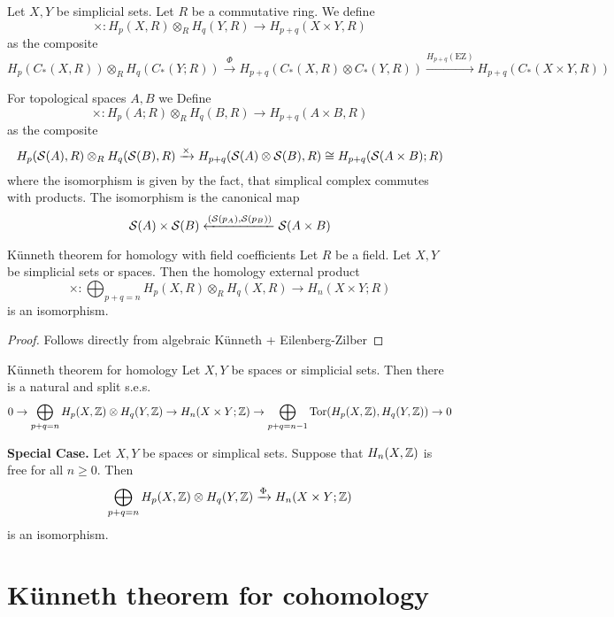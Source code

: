 \documentclass[language=english]{TemplateLecture}
\begin{document}
\begin{construction}
    Let \(X,Y\) be simplicial sets. Let \(R\) be a commutative ring. We define
    \[\times \colon H_p(X,R) \otimes_R H_q(Y,R) \to H_{p+q} (X\times Y, R)\]
    as the composite
    \[H_p(C_*(X,R)) \otimes_R H_q(C_*(Y; R)) \xrightarrow{\Phi} H_{p+q}(C_*(X, R) \otimes C_*(Y,R)) \xrightarrow{H_{p+q}(\mathrm{EZ})} H_{p+q}(C_*(X\times Y, R))\]
    
    For topological spaces \(A,B\) we Define
    \[\times \colon H_p(A; R) \otimes _R H_q(B,R) \to H_{p+q}(A\times B, R)\]
    as the composite
    \[H_p(\mathcal{S}(A),R) \otimes_R H_q(\mathcal{S}(B),R) \xrightarrow{\times} H_{p+q}(\mathcal{S}(A) \otimes \mathcal{S}(B), R) \cong H_{p+q}(\mathcal{S}(A\times B); R)\]
    where the isomorphism is given by the fact, that simplical complex commutes with products. The isomorphism is the canonical map
    \[\mathcal{S}(A) \times \mathcal{S}(B) \xleftarrow{(\mathcal{S}(p_A), \mathcal{S}(p_B))} \mathcal{S}(A\times B)\]
\end{construction}

\begin{thm}{Künneth theorem for homology with field coefficients}{}
    Let \(R\) be a field. Let \(X,Y\) be simplicial sets or spaces. Then the homology external product
    \[\times \colon \bigoplus_{p+q = n} H_p(X,R) \otimes_R H_q(X,R) \to H_n(X\times Y; R)\]
    is an isomorphism.
\end{thm}

\begin{proof}
    Follows directly from algebraic Künneth + Eilenberg-Zilber
\end{proof}

\begin{thm}{Künneth theorem for homology}{}
    Let \(X,Y\) be spaces or simplicial sets. Then there is a natural and split s.e.s. 
    \[0 \to \bigoplus_{p+q = n} H_p(X, \mathbb{Z}) \otimes H_q(Y, \mathbb{Z}) \to H_n(X\times Y; \mathbb{Z}) \to \bigoplus_{p+q = n-1} \mathrm{Tor}(H_p(X,\mathbb{Z}) , H_q(Y, \mathbb{Z})) \to 0\]
\end{thm}

\textbf{Special Case.} Let \(X, Y\) be spaces or simplical sets. Suppose that \(H_n(X, \mathbb{Z})\) is free for all \(n \geq 0\). Then
\[\bigoplus_{p+q = n} H_p(X, \mathbb{Z}) \otimes H_q(Y, \mathbb{Z}) \xrightarrow{\Phi} H_n(X\times Y; \mathbb{Z})\]
is an isomorphism.

\section{Künneth theorem for cohomology}
\end{document}
